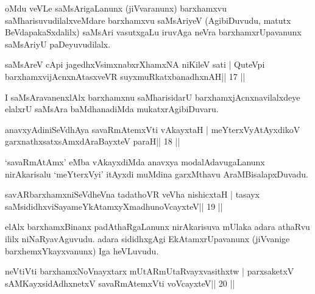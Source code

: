 \begin{artha}
oMdu veVLe saMsArigaLanunx (jiVvaranunx) barxhamxvu saMharisuvudilalxveMdare barxhamxvu saMsAriyeV (AgibiDuvudu, matutx BeVdapakaSxdalilx) saMsAri vasutxgaLu iruvAga neVra barxhamxrUpavanunx saMsAriyU paDeyuvudilalx.
\end{artha}

\begin{shl}
saMsAreV cApi jagedhxV\s simxnabxrXhamxNA niKileV sati |
QuteV\s pi barxhamxvijAcnxnAtasxveVR suyxmuRkatxbanadhxnAH\hfill || 17 ||
\end{shl}

\begin{artha}
I saMsAravanenxlAlx barxhamxnu saMharisidarU barxhamxjAcnxnavilalxdeye elalxrU saMsAra baMdhanadiMda mukatxrAgibiDuvaru.
\end{artha}


\begin{shl}
anavxyAdiniSeVdhAya savaRmAtemxVti vAkayxtaH |
meYterxVyAtAyxdikoV garxnathxsatxsAmxdAraBayxteV paraH\hfill || 18 ||
\end{shl}

\begin{artha}
`savaRmAtAmx' eMba vAkayxdiMda anavxya modalAdavugaLanunx nirAkarisalu `meYterxVyi' itAyxdi muMdina garxMthavu AraMBisalapxDuvadu.
\end{artha}


\begin{shl}
savARbarxhamxniSeVdheVna tadathoVR veVha nishicxtaH |
tasayx saMsididhxviSayameYkAtamxyXmadhunoVcayxteV\hfill || 19 ||
\end{shl}

\begin{artha}
elAlx barxhamxBinanx padAthaRgaLanunx nirAkarisuva mUlaka adara athaRvu ililx niNaRyavAguvudu. adara sididhxgAgi EkAtamxrUpavanunx (jiVvanige barxhemxYkayxvanunx) Iga heVLuvudu.
\end{artha}


\begin{shl}
neVtiVti barxhamxNoV\s nayxtarx mUtARmUtaRvayxvasithxtw |
parxsaketxV sAMKayxsidAdhxnetxV savaRmAtemxVti voVcayxteV\hfill || 20 ||
\end{shl}

